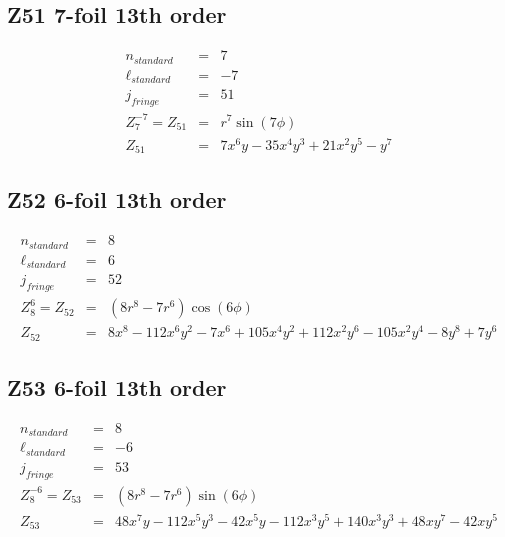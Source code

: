\documentclass[10pt]{article}
\begin{document}
  \subsection{Z51 7-foil 13th order}
    \begin{subequations}
    \begin{eqnarray}
        n_{standard} &=&7\\
        \ell_{standard} &=&-7\\
        j_{fringe} &=&51\\
        Z_{7}^{-7} = Z_{51} &=& r^{7} \sin{\left(7 \phi \right)}\\
        Z_{51} &=& 7 x^{6} y - 35 x^{4} y^{3} + 21 x^{2} y^{5} - y^{7}
    \end{eqnarray}
    \end{subequations}
  \subsection{Z52 6-foil 13th order}
    \begin{subequations}
    \begin{eqnarray}
        n_{standard} &=&8\\
        \ell_{standard} &=&6\\
        j_{fringe} &=&52\\
        Z_{8}^{6} = Z_{52} &=& \left(8 r^{8} - 7 r^{6}\right) \cos{\left(6 \phi \right)}\\
        Z_{52} &=& 8 x^{8} - 112 x^{6} y^{2} - 7 x^{6} + 105 x^{4} y^{2} + 112 x^{2} y^{6} - 105 x^{2} y^{4} - 8 y^{8} + 7 y^{6}
    \end{eqnarray}
    \end{subequations}
  \subsection{Z53 6-foil 13th order}
    \begin{subequations}
    \begin{eqnarray}
        n_{standard} &=&8\\
        \ell_{standard} &=&-6\\
        j_{fringe} &=&53\\
        Z_{8}^{-6} = Z_{53} &=& \left(8 r^{8} - 7 r^{6}\right) \sin{\left(6 \phi \right)}\\
        Z_{53} &=& 48 x^{7} y - 112 x^{5} y^{3} - 42 x^{5} y - 112 x^{3} y^{5} + 140 x^{3} y^{3} + 48 x y^{7} - 42 x y^{5}
    \end{eqnarray}
    \end{subequations}
\end{document}
